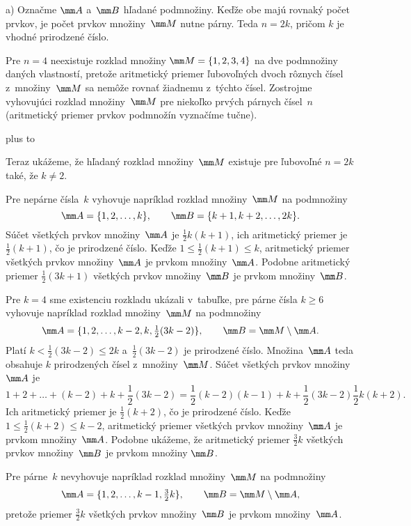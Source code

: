 {%
a) Označme $\mm A$ a~$\mm B$ hľadané podmnožiny. Keďže obe majú
rovnaký počet prvkov, je počet prvkov množiny~$\mm M$ nutne párny.
Teda $n=2k$, pričom $k$ je vhodné prirodzené číslo.

Pre $n=4$ neexistuje rozklad množiny $\mm M=\{1,2,3,4\}$ na dve
podmnožiny daných vlastností, pretože aritmetický priemer
ľubovoľných dvoch rôznych čísel z~množiny~$\mm M$ sa nemôže rovnať
žiadnemu z~týchto čísel. Zostrojme vyhovujúci rozklad množiny~$\mm M$
pre niekoľko prvých párnych čísel~$n$ (aritmetický priemer prvkov
podmnožín vyznačíme tučne).

\medskip
{\tabskip 0pt plus\hsize
\halign to}

\medskip
Teraz ukážeme, že hľadaný rozklad množiny~$\mm M$ existuje pre
ľubovoľné $n=2k$ také, že $k\ne2$.

Pre nepárne čísla~$k$ vyhovuje napríklad rozklad
množiny~$\mm M$ na podmnožiny
$$
\mm A=\{1,2,\dots,k\},\qquad \mm B=\{k+1,k+2,\dots,2k\}.
$$
Súčet všetkých prvkov množiny~$\mm A$ je $\frac12k(k+1)$, ich
aritmetický priemer je $\frac12(k+1)$, čo je prirodzené číslo.
Keďže $1\le \frac12(k+1)\le k$, aritmetický priemer všetkých
prvkov množiny~$\mm A$ je prvkom množiny~$\mm A$. Podobne aritmetický priemer
$\frac12(3k+1)$ všetkých prvkov množiny~$\mm B$ je prvkom množiny~$\mm B$.

Pre $k=4$ sme existenciu rozkladu ukázali v~tabuľke, pre párne
čísla $k\ge 6$ vyhovuje napríklad rozklad množiny~$\mm M$ na podmnožiny
$$
\textstyle \mm A=\{1,2,\dots,k-2,k,\frac12(3k-2)\},\qquad
\mm B=\mm M\setminus\mm A.
$$
Platí $k<\frac12(3k-2)\le2k$ a~$\frac12(3k-2)$ je
prirodzené číslo. Množina~$\mm A$ teda obsahuje $k$ prirodzených čísel
z~množiny~$\mm M$. Súčet všetkých prvkov množiny~$\mm A$ je
$$
\textstyle
1+2+\dots+(k-2)+k+\frac12(3k-2)=\frac12(k-2)(k-1)+k+\frac12(3k-2)\frac12k(k+2).
$$
Ich aritmetický priemer je $\frac12(k+2)$, čo je
prirodzené číslo. Keďže $1\le\frac12(k+2)\le k-2$,
aritmetický priemer všetkých prvkov množiny~$\mm A$ je prvkom množiny~$\mm A$.
Podobne ukážeme, že aritmetický priemer $\frac32 k$ všetkých prvkov
množiny~$\mm B$ je prvkom množiny $\mm B$.

\poznamka
Pre párne~$k$ nevyhovuje napríklad rozklad množiny~$\mm M$ na podmnožiny
$$
\textstyle \mm A=\{1,2,\dots,k-1,\frac32 k\},\qquad
\mm B=\mm M\setminus\mm A,
$$
pretože priemer $\frac32 k$ všetkých prvkov množiny~$\mm B$ je prvkom množiny~$\mm A$.

}
